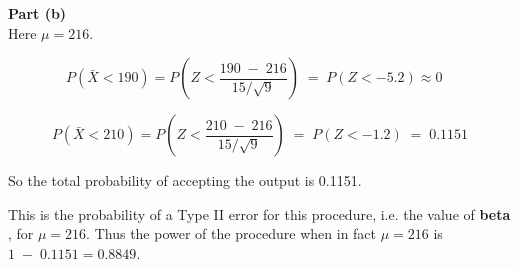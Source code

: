 \documentclass[a4paper,12pt]{article}
\begin{document}
\noindent \textbf{Part (b)}\\ 
\noindent  Here $\mu  = 216$. 


\[ P \left( \bar{X} < 190 \right) = P \left( Z <  \frac{190 \;-\; 216}{ 15/\sqrt{9} } \right) \;=\; P( Z < -5.2) \approx 0\;\;\;   \]

\[ P \left( \bar{X} < 210 \right) = P \left( Z <  \frac{210 \;-\; 216}{ 15/\sqrt{9} } \right) \;=\; P( Z < -1.2) \;=\; 0.1151 \]


\large 
\noindent   So the total probability of accepting the output is 0.1151. 

\medskip
 
\large 
\noindent  This is the probability of a Type II error for this procedure, i.e. the value of \textbf{beta} , for $\mu  = 216$.  Thus the power of the procedure when in fact $\mu  = 216$ is $1 \;-\; 0.1151 = 0.8849$.

\end{document}
